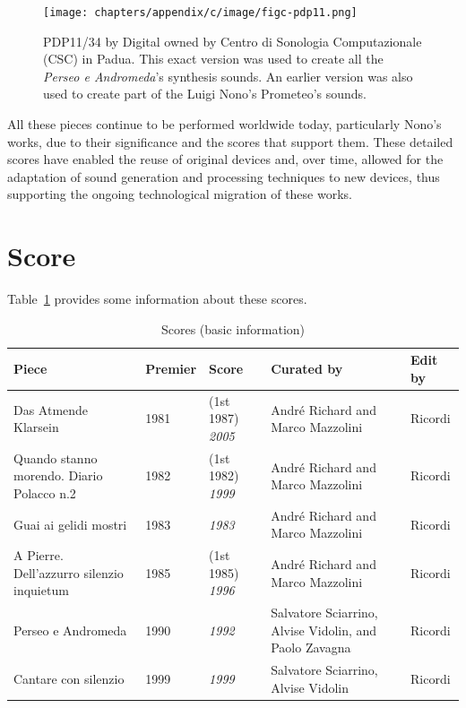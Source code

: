 \begin{figure}[!h]
    \centering
    \texttt{[image: chapters/appendix/c/image/figc-pdp11.png]}
    \caption{PDP11/34 by Digital owned by Centro di Sonologia Computazionale (CSC) in Padua. This exact version was used to create all the \textit{Perseo e Andromeda}'s synthesis sounds. An earlier version was also used to create part of the Luigi Nono's Prometeo's sounds.}
    \label{fig:enter-label}
\end{figure}
All these pieces continue to be performed worldwide today, particularly Nono’s works, due to their significance and the scores that support them. These detailed scores have enabled the reuse of original devices and, over time, allowed for the adaptation of sound generation and processing techniques to new devices, thus supporting the ongoing technological migration of these works.

\section{\label{sec:ac-score-section}Score}
Table~\ref{tab:c-scores} provides some information about these scores.

\begin{longtable}{|p{}|p{}|p{}|p{}|p{}|}
    \caption{Scores (basic information)} \label{tab:c-scores} \\
    \hline
    \textbf{Piece} & \textbf{Premier} & \textbf{Score} & \textbf{Curated by} & \textbf{Edit by} \\
    \hline
    \scriptsize Das Atmende Klarsein \cite{nono1981das} & \scriptsize 1981 & \scriptsize (1st 1987) \textit{2005} & \scriptsize André Richard and Marco Mazzolini & \scriptsize Ricordi \\\hline
    \scriptsize Quando stanno morendo. Diario Polacco n.2 \cite{nono1982quando} & \scriptsize 1982 & \scriptsize (1st 1982) \textit{1999} & \scriptsize André Richard and Marco Mazzolini & \scriptsize Ricordi \\\hline
    \scriptsize Guai ai gelidi mostri \cite{nono1983guai} & \scriptsize 1983 & \scriptsize \textit{1983} & \scriptsize André Richard and Marco Mazzolini & \scriptsize Ricordi \\\hline
    \scriptsize A Pierre. Dell’azzurro silenzio inquietum \cite{nono1985a} & \scriptsize 1985 & \scriptsize (1st 1985) \textit{1996} & \scriptsize André Richard and Marco Mazzolini & \scriptsize Ricordi \\\hline
    \scriptsize Perseo e Andromeda \cite{sciarrino1990perseo} & \scriptsize 1990 & \scriptsize \textit{1992} & \scriptsize Salvatore Sciarrino, Alvise Vidolin, and Paolo Zavagna & \scriptsize Ricordi \\\hline
    \scriptsize Cantare con silenzio \cite{sciarrino1999cantare} & \scriptsize 1999 & \scriptsize \textit{1999} & \scriptsize Salvatore Sciarrino, Alvise Vidolin & \scriptsize Ricordi \\\hline
\end{longtable}

